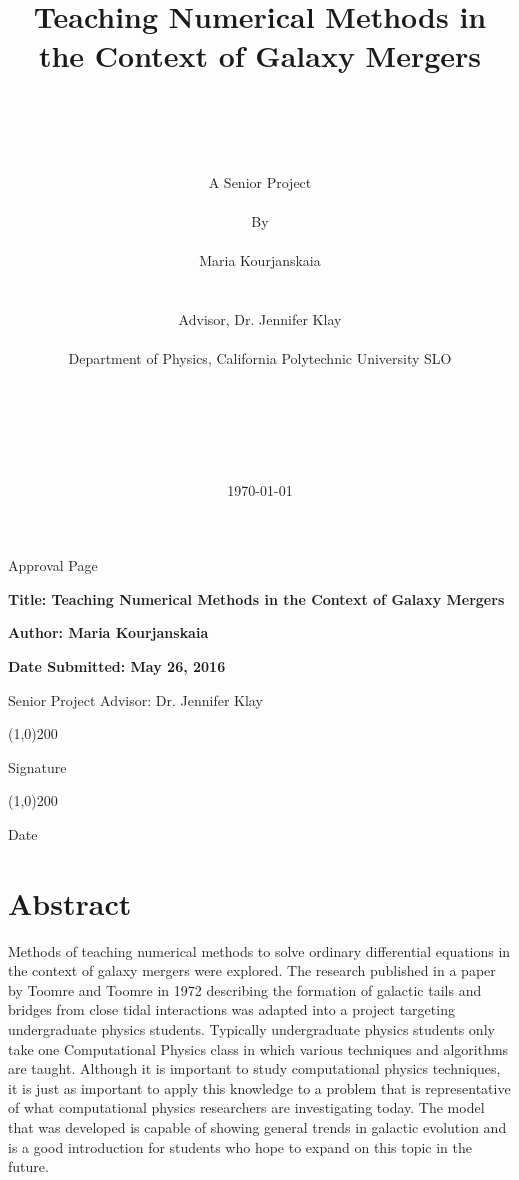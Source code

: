 \documentclass[11pt]{article}
\title{Teaching Numerical Methods in the Context of Galaxy Mergers}
\author
{\\
\\
\\
\\
A Senior Project
\\
\\
By
\\
\\
Maria Kourjanskaia
\\
\\
\\ 
\normalsize{Advisor, Dr. Jennifer Klay}
\\
\\
\normalsize{Department of Physics, California Polytechnic University SLO}\\
\\
\\
\\
\\
\\
}
\date{\today}
\begin{document}
\baselineskip21pt
\maketitle


\newpage

\begin{center}Approval Page\end{center}
\bigskip

\begin{flushleft}
\textbf{Title: Teaching Numerical Methods in the Context of Galaxy Mergers}
\medskip

\textbf{Author: Maria Kourjanskaia}
\medskip

\textbf{Date Submitted: May 26, 2016}
\end{flushleft}

\bigskip
\bigskip
\bigskip
\bigskip
\bigskip
\bigskip
\bigskip
\bigskip
\bigskip
\bigskip
\bigskip
\bigskip
\bigskip
\bigskip
\bigskip
\bigskip
\bigskip
\bigskip
\bigskip


\begin{flushright}
Senior Project Advisor: Dr. Jennifer Klay

\bigskip
\bigskip


\line(1,0){200}

Signature
\bigskip

\line(1,0){200}

Date



\end{flushright}




\newpage

\tableofcontents

\listoftables

\listoffigures

\newpage

\section{Abstract}
Methods of teaching numerical methods to solve ordinary differential equations in the context of galaxy mergers were explored. The research published in a paper by Toomre and Toomre in 1972 describing the formation of galactic tails and bridges from close tidal interactions was adapted into a project targeting undergraduate physics students. Typically undergraduate physics students only take one Computational Physics class in which various techniques and algorithms are taught. Although it is important to study computational physics techniques, it is just as important to apply this knowledge to a problem that is representative of what computational physics researchers are investigating today. The model that was developed is capable of showing general trends in galactic evolution and is a good introduction for students who hope to expand on this topic in the future.
\end{document}
